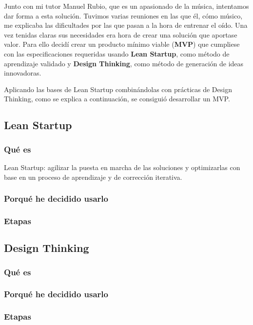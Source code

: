 \documentclass[12pt,twoside,titlepage]{report}
\begin{document}
Junto con mi tutor Manuel Rubio, que es un apasionado de la música, intentamos dar forma a esta solución. Tuvimos varias reuniones en las que él, cómo músico, me explicaba las dificultades por las que pasan a la hora de entrenar el oído. Una vez tenidas claras sus necesidades era hora de crear una solución que aportase valor. Para ello decidí crear un producto mínimo viable (\textbf{MVP}) que cumpliese con las especificaciones requeridas usando \textbf{Lean Startup}, como método de aprendizaje validado y \textbf{Design Thinking}, como método de generación de ideas innovadoras.

Aplicando las bases de Lean Startup combinándolas con prácticas de Design Thinking, como se explica a continuación, se consiguió desarrollar un MVP.

\subsection{Lean Startup}
\subsubsection{Qué es}
Lean Startup: agilizar la puesta en marcha de las soluciones y optimizarlas con base en un proceso de aprendizaje y de corrección iterativa.

\subsubsection{Porqué he decidido usarlo}
\subsubsection{Etapas}

\subsection{Design Thinking}

\subsubsection{Qué es}
\subsubsection{Porqué he decidido usarlo}
\subsubsection{Etapas}
\end{document}
